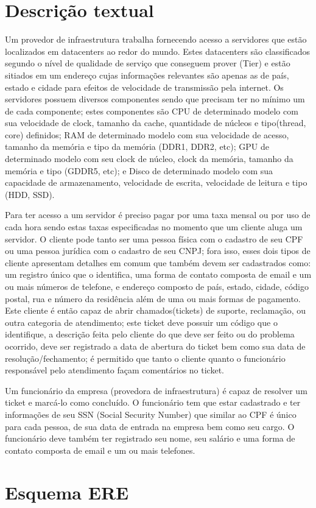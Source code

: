 \documentclass[a4paper]{article}
\begin{document}
\begin{large}
\section{Descrição textual}
\quad Um provedor de infraestrutura trabalha fornecendo acesso a servidores que estão localizados em datacenters ao redor do mundo. Estes datacenters são classificados segundo o nível de qualidade de serviço que conseguem prover (Tier) e estão sitiados em um endereço cujas informações relevantes são apenas as de país, estado e cidade para efeitos de velocidade de transmissão pela internet. Os servidores possuem diversos componentes sendo que precisam ter no mínimo um de cada componente; estes componentes são CPU de determinado modelo com sua velocidade de clock, tamanho da cache, quantidade de núcleos e tipo(thread, core) definidos; RAM de determinado modelo com sua velocidade de acesso, tamanho da memória e tipo da memória (DDR1, DDR2, etc); GPU de determinado modelo com seu clock de núcleo, clock da memória, tamanho da memória e tipo (GDDR5, etc); e Disco de determinado modelo com sua capacidade de armazenamento, velocidade de escrita, velocidade de leitura e tipo (HDD, SSD).
\par Para ter acesso a um servidor é preciso pagar por uma taxa mensal ou por uso de cada hora sendo estas taxas especificadas no momento que um cliente aluga um servidor. O cliente pode tanto ser uma pessoa física com o cadastro de seu CPF ou uma pessoa jurídica com o cadastro de seu CNPJ; fora isso, esses dois tipos de cliente apresentam detalhes em comum que também devem ser cadastrados como: um registro único que o identifica, uma forma de contato composta de email e um ou mais números de telefone, e endereço composto de país, estado, cidade, código postal, rua e número da residência além de uma ou mais formas de pagamento. Este cliente é então capaz de abrir chamados(tickets) de suporte, reclamação, ou outra categoria de atendimento; este ticket deve possuir um código que o identifique, a descrição feita pelo cliente do que deve ser feito ou do problema ocorrido, deve ser registrado a data de abertura do ticket bem como sua data de resolução/fechamento; é permitido que tanto o cliente quanto o funcionário responsável pelo atendimento façam comentários no ticket.
\par Um funcionário da empresa (provedora de infraestrutura) é capaz de resolver um ticket e marcá-lo como concluído. O funcionário tem que estar cadastrado e ter informações de seu SSN (Social Security Number) que similar ao CPF é único para cada pessoa, de sua data de entrada na empresa bem como seu cargo. O funcionário deve também ter registrado seu nome, seu salário e uma forma de contato composta de email e um ou mais telefones.
\section{Esquema ERE}
\end{large}
\clearpage
\end{document}
